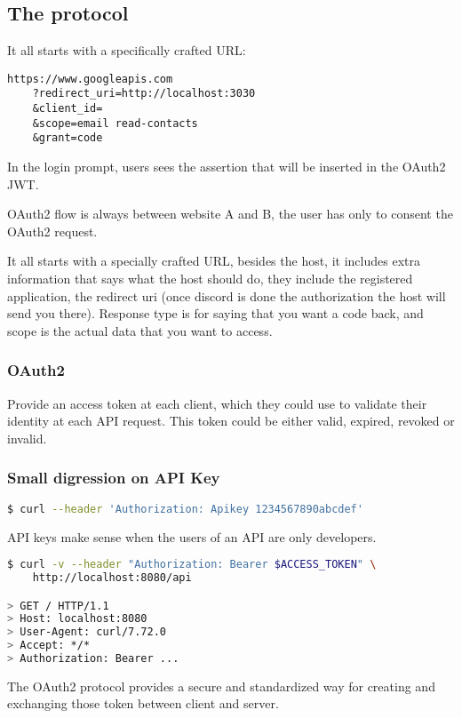 \subsection{The protocol}
It all starts with a specifically crafted URL:
\begin{lstlisting}
https://www.googleapis.com
    ?redirect_uri=http://localhost:3030
    &client_id=
    &scope=email read-contacts
    &grant=code
\end{lstlisting}

In the login prompt, users sees the assertion that will be inserted in the
OAuth2 JWT.

OAuth2 flow is always between website A and B, the user has only to consent the
OAuth2 request.

It all starts with a specially crafted URL, besides the host, it includes extra
information that says what the host should do, they include the registered
application, the redirect uri (once discord is done the authorization the host
will send you there). Response type is for saying that you want a code back, and
scope is the actual data that you want to access.


\subsubsection{OAuth2}
Provide an access token at each client, which they could use to validate their
identity at each API request.  This token could be either valid, expired,
revoked or invalid.

\subsubsection{Small digression on API Key}
\begin{lstlisting}[language=bash]
$ curl --header 'Authorization: Apikey 1234567890abcdef'
\end{lstlisting}
API keys make sense when the users of an API are only developers.


\begin{lstlisting}[language=bash]
$ curl -v --header "Authorization: Bearer $ACCESS_TOKEN" \
    http://localhost:8080/api

> GET / HTTP/1.1
> Host: localhost:8080
> User-Agent: curl/7.72.0
> Accept: */*
> Authorization: Bearer ...
\end{lstlisting}

The OAuth2 protocol provides a secure and standardized way for creating and exchanging those token between client and server.


